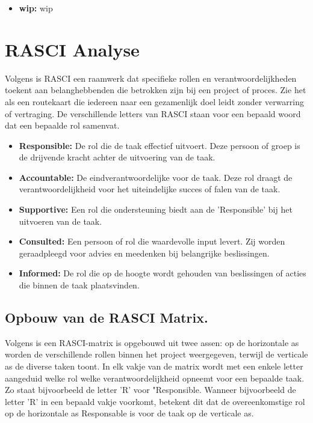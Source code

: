 \begin{itemize}
    \item \textbf{wip:} wip
    
\end{itemize}



\section{RASCI Analyse}

Volgens \textcite{Epam2024} is RASCI een raamwerk dat specifieke rollen en verantwoordelijkheden toekent aan belanghebbenden die betrokken zijn bij een project of proces. Zie het als een routekaart die iedereen naar een gezamenlijk doel leidt zonder verwarring of vertraging. 
De verschillende letters van RASCI staan voor een bepaald woord dat een bepaalde rol samenvat.

\begin{itemize}
    \item \textbf{Responsible:} De rol die de taak effectief uitvoert. Deze persoon of groep is de drijvende kracht achter de uitvoering van de taak. 
    \item \textbf{Accountable:} De eindverantwoordelijke voor de taak. Deze rol draagt de verantwoordelijkheid voor het uiteindelijke succes of falen van de taak. 
    \item \textbf{Supportive:} Een rol die ondersteuning biedt aan de 'Responsible' bij het uitvoeren van de taak. 
    \item \textbf{Consulted:} Een persoon of rol die waardevolle input levert. Zij worden geraadpleegd voor advies en meedenken bij belangrijke beslissingen.
    \item \textbf{Informed:} De rol die op de hoogte wordt gehouden van beslissingen of acties die binnen de taak plaatsvinden.
\end{itemize}

\subsection{Opbouw van de RASCI Matrix.}
Volgens \textcite{Cabanillas2011} is een RASCI-matrix is opgebouwd uit twee assen: op de horizontale as worden de verschillende rollen binnen het project weergegeven, terwijl de verticale as de diverse taken toont. In elk vakje van de matrix wordt met een enkele letter aangeduid welke rol welke verantwoordelijkheid opneemt voor een bepaalde taak. 
Zo staat bijvoorbeeld de letter 'R' voor "Responsible. Wanneer bijvoorbeeld de letter 'R' in een bepaald vakje voorkomt, betekent dit dat de overeenkomstige rol op de horizontale as Responsable is voor de taak op de verticale as. \autocite{Cabanillas2011}

